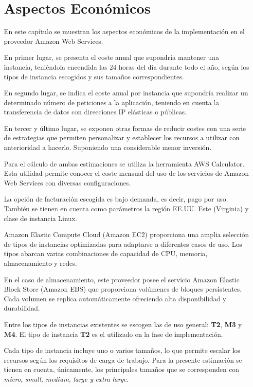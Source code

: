 \chapter{Aspectos Económicos}
\label{cha:economic}

En este capítulo se muestran los aspectos económicos de la implementación en el proveedor Amazon Web Services. 

En primer lugar, se presenta el coste anual que supondría mantener una instancia, teniéndola encendida las 24 horas del día durante todo el año, según los tipos de instancia escogidos y sus tamaños correspondientes.

En segundo lugar, se indica el coste anual por instancia que supondría realizar un determinado número de peticiones a la aplicación, teniendo en cuenta la transferencia de datos con direcciones IP elásticas o públicas. 

En tercer y último lugar, se exponen otras formas de reducir costes con una serie de estrategias que permiten personalizar y establecer los recursos a utilizar con anterioridad a hacerlo. Suponiendo una considerable menor inversión.

Para el cálculo de ambas estimaciones se utiliza la herramienta AWS Calculator\cite{AWS Calculator}. Esta utilidad permite conocer el coste mensual del uso de los servicios de Amazon Web Services con diversas configuraciones.

La opción de facturación escogida es bajo demanda, es decir, pago por uso. También se tienen en cuenta como parámetros la región EE.UU. Este (Virginia) y clase de instancia Linux.

Amazon Elastic Compute Cloud (Amazon EC2) proporciona una amplia selección de tipos de instancias optimizadas para adaptarse a diferentes casos de uso. Los tipos abarcan varias combinaciones de capacidad de CPU, memoria, almacenamiento y redes. 

En el caso de almacenamiento, este proveedor posee el servicio Amazon Elastic Block Store (Amazon EBS)\cite{AWS EBS} que proporciona volúmenes de bloques persistentes. Cada volumen se replica automáticamente ofreciendo alta disponibilidad y durabilidad. 

Entre los tipos de instancias existentes se escogen las de uso general: \textbf{T2}, \textbf{M3} y \textbf{M4}. El tipo de instancia \textbf{T2} es el utilizado en la fase de implementación. 

Cada tipo de instancia incluye uno o varios tamaños, lo que permite escalar los recursos según los requisitos de carga de trabajo. Para la presente estimación se tienen en cuenta, únicamente, los principales tamaños que se corresponden con \textit{micro, small, medium, large y extra large}.

